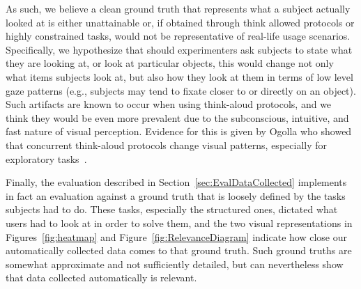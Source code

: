 As such, we believe a clean ground truth that represents what a subject actually looked at is either unattainable or, if obtained through think allowed protocols or highly constrained tasks, would not be representative of real-life usage scenarios. Specifically, we hypothesize that should experimenters ask subjects to state what they are looking at, or look at particular objects, this would change not only what items subjects look at, but also how they look at them in terms of low level gaze patterns (e.g., subjects may tend to fixate closer to or directly on an object). Such artifacts are known to occur when using think-aloud protocols, and we think they would be even more prevalent due to the subconscious, intuitive, and fast nature of visual perception.  Evidence for this is given by Ogolla who showed that concurrent think-aloud protocols change visual patterns, especially for exploratory tasks~\cite{ogolla2011usability}.
 

Finally, the evaluation described in Section~\ref{sec:EvalDataCollected} implements in fact an evaluation against a ground truth that is loosely defined by the tasks subjects had to do. These tasks, especially the structured ones, dictated what users had to look at in order to solve them, and the two visual representations in Figures~\ref{fig:heatmap} and Figure~\ref{fig:RelevanceDiagram} indicate how close our automatically collected data comes to that ground truth. Such ground truths are somewhat approximate and not sufficiently detailed, but can nevertheless show that data collected automatically is relevant. 


